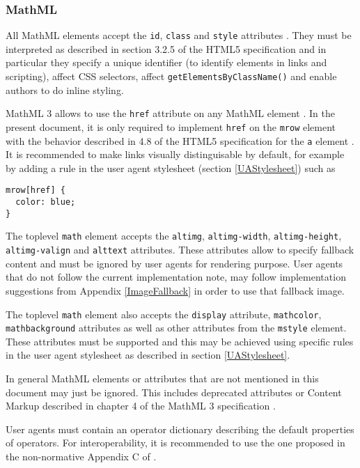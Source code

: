 \subsubsection{MathML}

All MathML elements accept the {\tt id}, {\tt class} and {\tt style} attributes
\cite{MathML3}. They must be interpreted as described in section 3.2.5 of the
HTML5 specification \cite{HTML5} and in particular they specify a unique
identifier (to identify elements in links and scripting), affect
CSS selectors, affect {\tt getElementsByClassName()} and enable authors to do
inline styling.

MathML 3 allows to use the {\tt href} attribute on any MathML element
\cite{MathML3}. In the present document, it is only required to implement
{\tt href} on the {\tt mrow} element with the behavior described in 4.8
of the HTML5 specification for the {\tt a} element \cite{HTML5}. It is
recommended to make links visually distinguisable by default, for example by
adding a rule in the user agent stylesheet (section \ref{UAStylesheet}) such as
\begin{lstlisting}
mrow[href] {
  color: blue;
}
\end{lstlisting}

The toplevel {\tt math} element accepts the {\tt altimg}, {\tt altimg-width},
{\tt altimg-height}, {\tt altimg-valign} and {\tt alttext} attributes.
These attributes allow to specify fallback content and must be ignored by
user agents for rendering purpose. User agents that do not follow the current
implementation note, may follow implementation suggestions from Appendix
\ref{ImageFallback} in order to use that fallback image.

The toplevel {\tt math} element also accepts the {\tt display} attribute,
{\tt mathcolor}, {\tt mathbackground} attributes as well as other attributes
from the {\tt mstyle} element. These attributes must be supported and this
may be achieved using specific rules in the user agent stylesheet
as described in section \ref{UAStylesheet}.

In general MathML elements or attributes that are not mentioned in this
document may just be ignored. This includes deprecated attributes or
Content Markup described in chapter 4 of the MathML 3 specification
\cite{MathML3}.

User agents must contain an operator dictionary describing the default
properties of operators. For interoperability, it is recommended to use the one
proposed in the non-normative Appendix C of \cite{MathML3}.

